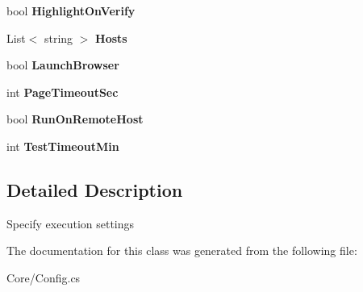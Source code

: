 \begin{DoxyCompactItemize}
\item 
\hypertarget{class_proto_test_1_1_golem_1_1_core_1_1_config_settings_1_1_runtime_settings_af0b316d29175753543290ea14ab608fd}{bool {\bfseries Highlight\-On\-Verify}}\label{class_proto_test_1_1_golem_1_1_core_1_1_config_settings_1_1_runtime_settings_af0b316d29175753543290ea14ab608fd}

\item 
\hypertarget{class_proto_test_1_1_golem_1_1_core_1_1_config_settings_1_1_runtime_settings_a5c33f415753c5162efeecc74b0b5cb6a}{List$<$ string $>$ {\bfseries Hosts}}\label{class_proto_test_1_1_golem_1_1_core_1_1_config_settings_1_1_runtime_settings_a5c33f415753c5162efeecc74b0b5cb6a}

\item 
\hypertarget{class_proto_test_1_1_golem_1_1_core_1_1_config_settings_1_1_runtime_settings_ab8508a411d14391af47a8dd70fc248aa}{bool {\bfseries Launch\-Browser}}\label{class_proto_test_1_1_golem_1_1_core_1_1_config_settings_1_1_runtime_settings_ab8508a411d14391af47a8dd70fc248aa}

\item 
\hypertarget{class_proto_test_1_1_golem_1_1_core_1_1_config_settings_1_1_runtime_settings_a3b7f0ba5227e4d675ec99ed2d13639d9}{int {\bfseries Page\-Timeout\-Sec}}\label{class_proto_test_1_1_golem_1_1_core_1_1_config_settings_1_1_runtime_settings_a3b7f0ba5227e4d675ec99ed2d13639d9}

\item 
\hypertarget{class_proto_test_1_1_golem_1_1_core_1_1_config_settings_1_1_runtime_settings_a9b2310127dc6defe2b62dae0de915a84}{bool {\bfseries Run\-On\-Remote\-Host}}\label{class_proto_test_1_1_golem_1_1_core_1_1_config_settings_1_1_runtime_settings_a9b2310127dc6defe2b62dae0de915a84}

\item 
\hypertarget{class_proto_test_1_1_golem_1_1_core_1_1_config_settings_1_1_runtime_settings_a67f0a5500510068ff871131f0a23fcf4}{int {\bfseries Test\-Timeout\-Min}}\label{class_proto_test_1_1_golem_1_1_core_1_1_config_settings_1_1_runtime_settings_a67f0a5500510068ff871131f0a23fcf4}

\end{DoxyCompactItemize}


\subsection{Detailed Description}
Specify execution settings 



The documentation for this class was generated from the following file\-:\begin{DoxyCompactItemize}
\item 
Core/Config.\-cs\end{DoxyCompactItemize}
